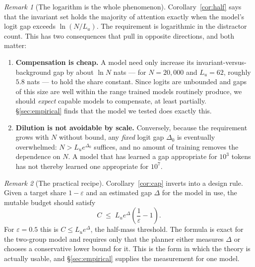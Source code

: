 \documentclass[11pt,a4paper]{article}
\theoremstyle{plain}
\theoremstyle{definition}
\theoremstyle{remark}
\newtheorem{remark}{Remark}
\begin{document}
\begin{remark}[The logarithm is the whole phenomenon]
\label{rem:log}
Corollary~\ref{cor:half} says that the invariant set holds the majority of
attention exactly when the model's logit gap exceeds $\ln(N/L_u)$. The
requirement is logarithmic in the distractor count. This has two consequences
that pull in opposite directions, and both matter:

\begin{enumerate}[label=(\roman*), leftmargin=*]
  \item \textbf{Compensation is cheap.} A model need only increase its
        invariant-versus-background gap by about $\ln N$ nats --- for
        $N = 20{,}000$ and $L_u = 62$, roughly $5.8$ nats --- to hold the share
        constant. Since logits are unbounded and gaps of this size are well
        within the range trained models routinely produce, we should \emph{expect}
        capable models to compensate, at least partially. \S\ref{sec:empirical}
        finds that the model we tested does exactly this.
  \item \textbf{Dilution is not avoidable by scale.} Conversely, because the
        requirement grows with $N$ without bound, any \emph{fixed} logit gap
        $\Delta_0$ is eventually overwhelmed: $N > L_u e^{\Delta_0}$ suffices,
        and no amount of training removes the dependence on $N$. A model that
        has learned a gap appropriate for $10^3$ tokens has not thereby learned
        one appropriate for $10^7$.
\end{enumerate}
\end{remark}

\begin{remark}[The practical recipe]
\label{rem:recipe}
Corollary~\ref{cor:cap} inverts into a design rule. Given a target share
$1-\varepsilon$ and an estimated gap $\Delta$ for the model in use, the mutable
budget should satisfy
\begin{equation}
  C \;\le\; L_u e^{\Delta}\left(\frac{1}{\varepsilon} - 1\right).
  \label{eq:recipe}
\end{equation}
For $\varepsilon = 0.5$ this is $C \le L_u e^{\Delta}$, the half-mass threshold.
The formula is exact for the two-group model and requires only that the planner
either measures $\Delta$ or chooses a conservative lower bound for it. This is
the form in which the theory is actually usable, and \S\ref{sec:empirical}
supplies the measurement for one model.
\end{remark}
\end{document}
